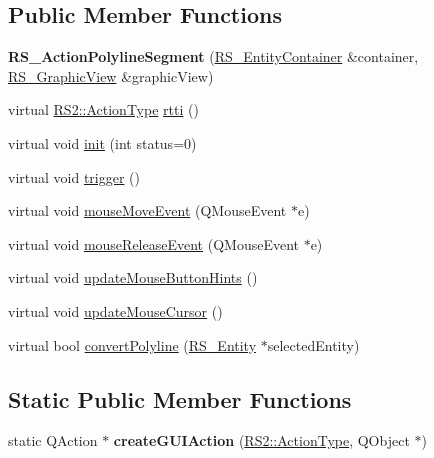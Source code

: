 \subsection*{Public Member Functions}
\begin{DoxyCompactItemize}
\item 
\hypertarget{classRS__ActionPolylineSegment_a9ef1232972c0900ef075ad2e4f25bd20}{{\bfseries R\-S\-\_\-\-Action\-Polyline\-Segment} (\hyperlink{classRS__EntityContainer}{R\-S\-\_\-\-Entity\-Container} \&container, \hyperlink{classRS__GraphicView}{R\-S\-\_\-\-Graphic\-View} \&graphic\-View)}\label{classRS__ActionPolylineSegment_a9ef1232972c0900ef075ad2e4f25bd20}

\item 
virtual \hyperlink{classRS2_afe3523e0bc41fd637b892321cfc4b9d7}{R\-S2\-::\-Action\-Type} \hyperlink{classRS__ActionPolylineSegment_a80d6aa800da578df95de1a2a73df1079}{rtti} ()
\item 
virtual void \hyperlink{classRS__ActionPolylineSegment_a02e276ef724f8018231c27663a949643}{init} (int status=0)
\item 
virtual void \hyperlink{classRS__ActionPolylineSegment_a48bc30353f471b2fbab78b7a19329382}{trigger} ()
\item 
virtual void \hyperlink{classRS__ActionPolylineSegment_a5c9f526c9eeb7fddea975d2623ef8952}{mouse\-Move\-Event} (Q\-Mouse\-Event $\ast$e)
\item 
virtual void \hyperlink{classRS__ActionPolylineSegment_ad1effaf3818ea933b79b743847f8e2f0}{mouse\-Release\-Event} (Q\-Mouse\-Event $\ast$e)
\item 
virtual void \hyperlink{classRS__ActionPolylineSegment_a45f69cc5b184d17c32378711d71a3d34}{update\-Mouse\-Button\-Hints} ()
\item 
virtual void \hyperlink{classRS__ActionPolylineSegment_a0768eabacf825c11c6205db2a7a13973}{update\-Mouse\-Cursor} ()
\item 
virtual bool \hyperlink{classRS__ActionPolylineSegment_af9c066d7b16f50d4dd8a71d8c30f2629}{convert\-Polyline} (\hyperlink{classRS__Entity}{R\-S\-\_\-\-Entity} $\ast$selected\-Entity)
\end{DoxyCompactItemize}
\subsection*{Static Public Member Functions}
\begin{DoxyCompactItemize}
\item 
\hypertarget{classRS__ActionPolylineSegment_a23b6642590340b8c51730edb0be796b4}{static Q\-Action $\ast$ {\bfseries create\-G\-U\-I\-Action} (\hyperlink{classRS2_afe3523e0bc41fd637b892321cfc4b9d7}{R\-S2\-::\-Action\-Type}, Q\-Object $\ast$)}\label{classRS__ActionPolylineSegment_a23b6642590340b8c51730edb0be796b4}

\end{DoxyCompactItemize}
